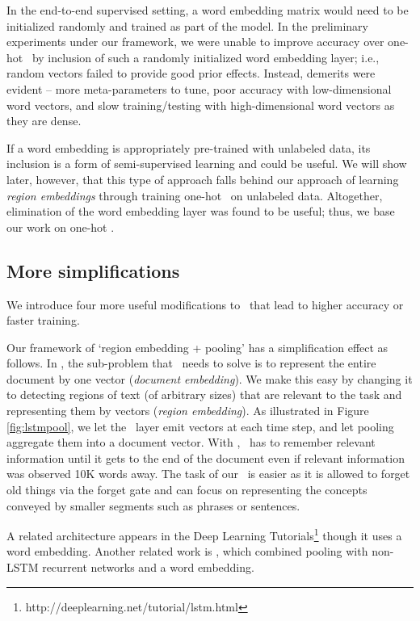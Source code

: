 \documentclass{article}
\begin{document}
In the end-to-end supervised setting, a word embedding matrix  would need to be initialized randomly and trained as part of the model. 
In the preliminary experiments under our framework, 
we were unable to improve accuracy over one-hot \lstm\ 
by inclusion of such a randomly initialized word embedding layer; i.e., 
random vectors failed to provide good prior effects. Instead, demerits 
were evident -- 
more meta-parameters to tune, 
poor accuracy with low-dimensional word vectors, and 
slow training/testing with high-dimensional word vectors as they are dense. 


If a word embedding is appropriately pre-trained with unlabeled data, 
its inclusion is a form of semi-supervised learning and could be useful.  
We will show later, however, 
that this type of approach falls behind our approach of learning {\em region embeddings} 
through training one-hot \lstm\ on unlabeled data.   
Altogether, elimination of the word embedding layer was found to be useful; 
thus, we base our work on one-hot \lstm. 


\subsection{More simplifications} 

We introduce four more useful modifications to \wvLstm\ 
that lead to higher accuracy or faster training.

Our framework of `region embedding + pooling' has a simplification effect as follows.   
In \wvLstm, the sub-problem that \lstm\ needs to solve is to represent the entire document 
by one vector ({\em document embedding}). We make this easy by changing it to detecting regions of text (of arbitrary sizes)  
that are relevant 
to the task and representing them by vectors ({\em region embedding}). 
As illustrated in Figure \ref{fig:lstmpool}, we let the \lstm\ layer emit vectors  at each time step, 
and let pooling aggregate them into a document vector.  
With \wvLstm, \lstm\ has to remember relevant information until it gets to the end of 
the document even if relevant information was observed 10K words away. 
The task of our \lstm\ is easier as it is allowed to forget old things via the forget gate 
and can focus on representing the concepts conveyed by smaller segments such as phrases or sentences.  


A related architecture appears in the Deep Learning Tutorials\footnote{
  {http://deeplearning.net/tutorial/lstm.html}
}
though it uses a word embedding.
Another related work is
\cite{LXLZ15}, which combined pooling with non-LSTM recurrent networks and a word embedding. 
\end{document}
